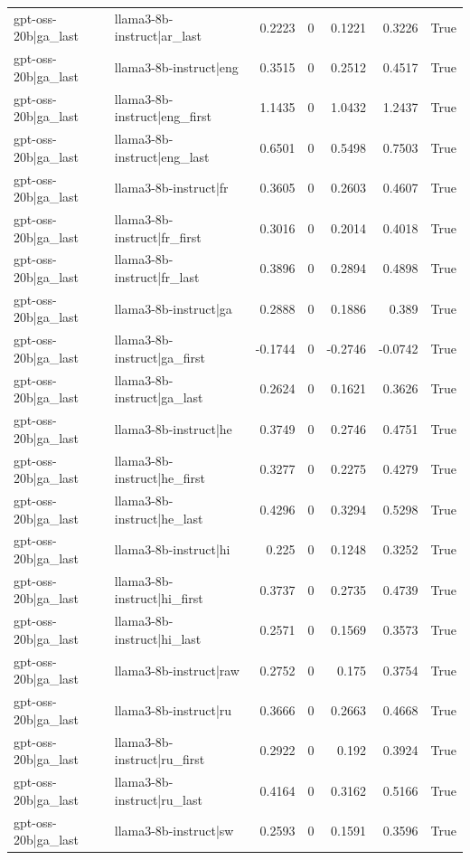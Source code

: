 \begin{table}
\begin{tabular}{l l r r r r l}
gpt-oss-20b|ga_last & llama3-8b-instruct|ar_last & 0.2223 & 0 & 0.1221 & 0.3226 & True \\
gpt-oss-20b|ga_last & llama3-8b-instruct|eng & 0.3515 & 0 & 0.2512 & 0.4517 & True \\
gpt-oss-20b|ga_last & llama3-8b-instruct|eng_first & 1.1435 & 0 & 1.0432 & 1.2437 & True \\
gpt-oss-20b|ga_last & llama3-8b-instruct|eng_last & 0.6501 & 0 & 0.5498 & 0.7503 & True \\
gpt-oss-20b|ga_last & llama3-8b-instruct|fr & 0.3605 & 0 & 0.2603 & 0.4607 & True \\
gpt-oss-20b|ga_last & llama3-8b-instruct|fr_first & 0.3016 & 0 & 0.2014 & 0.4018 & True \\
gpt-oss-20b|ga_last & llama3-8b-instruct|fr_last & 0.3896 & 0 & 0.2894 & 0.4898 & True \\
gpt-oss-20b|ga_last & llama3-8b-instruct|ga & 0.2888 & 0 & 0.1886 & 0.389 & True \\
gpt-oss-20b|ga_last & llama3-8b-instruct|ga_first & -0.1744 & 0 & -0.2746 & -0.0742 & True \\
gpt-oss-20b|ga_last & llama3-8b-instruct|ga_last & 0.2624 & 0 & 0.1621 & 0.3626 & True \\
gpt-oss-20b|ga_last & llama3-8b-instruct|he & 0.3749 & 0 & 0.2746 & 0.4751 & True \\
gpt-oss-20b|ga_last & llama3-8b-instruct|he_first & 0.3277 & 0 & 0.2275 & 0.4279 & True \\
gpt-oss-20b|ga_last & llama3-8b-instruct|he_last & 0.4296 & 0 & 0.3294 & 0.5298 & True \\
gpt-oss-20b|ga_last & llama3-8b-instruct|hi & 0.225 & 0 & 0.1248 & 0.3252 & True \\
gpt-oss-20b|ga_last & llama3-8b-instruct|hi_first & 0.3737 & 0 & 0.2735 & 0.4739 & True \\
gpt-oss-20b|ga_last & llama3-8b-instruct|hi_last & 0.2571 & 0 & 0.1569 & 0.3573 & True \\
gpt-oss-20b|ga_last & llama3-8b-instruct|raw & 0.2752 & 0 & 0.175 & 0.3754 & True \\
gpt-oss-20b|ga_last & llama3-8b-instruct|ru & 0.3666 & 0 & 0.2663 & 0.4668 & True \\
gpt-oss-20b|ga_last & llama3-8b-instruct|ru_first & 0.2922 & 0 & 0.192 & 0.3924 & True \\
gpt-oss-20b|ga_last & llama3-8b-instruct|ru_last & 0.4164 & 0 & 0.3162 & 0.5166 & True \\
gpt-oss-20b|ga_last & llama3-8b-instruct|sw & 0.2593 & 0 & 0.1591 & 0.3596 & True \\

\end{tabular}
\end{table}
